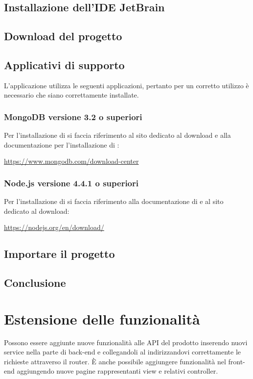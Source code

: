 \documentclass[12pt,a4paper]{article}
\begin{document}
	\subsection{Installazione dell'IDE JetBrain}
	\subsection{Download del progetto}
	\subsection{Applicativi di supporto} \label{app_supporto}
		
		L'applicazione \prj utilizza le seguenti applicazioni, pertanto per un corretto utilizzo è necessario che siano correttamente installate.
		\subsubsection{MongoDB versione 3.2 o superiori}
		Per l'installazione di  si faccia riferimento al sito dedicato al download e alla documentazione per l'installazione di :
		\begin{center} \url{https://www.mongodb.com/download-center}
		\end{center}
		
		\subsubsection{Node.js versione 4.4.1 o superiori}
		Per l'installazione di  si faccia riferimento alla documentazione di  e al sito dedicato al download:
		\begin{center} \url{https://nodejs.org/en/download/} 
		\end{center}
	\subsection{Importare il progetto}
	\subsection{Conclusione}
	\newpage
	\section{Estensione delle funzionalità}
	Possono essere aggiunte nuove funzionalità alle API del prodotto inserendo nuovi service nella parte di back-end e collegandoli al indirizzandovi correttamente le richieste attraverso il router. È anche possibile aggiungere funzionalità nel front-end aggiungendo nuove pagine rappresentanti view e relativi controller.
\end{document}
